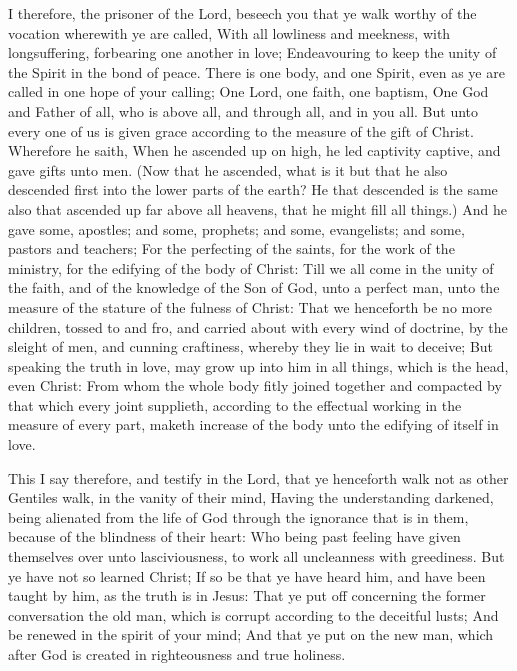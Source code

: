  I therefore, the prisoner of the Lord, beseech you that
ye walk worthy of the vocation wherewith ye are called, 
With all lowliness and meekness, with longsuffering, forbearing one
another in love;  Endeavouring to keep the unity of the
Spirit in the bond of peace.  There is one body, and one
Spirit, even as ye are called in one hope of your calling;
 One Lord, one faith, one baptism,  One God
and Father of all, who is above all, and through all, and in you all.
 But unto every one of us is given grace according to the
measure of the gift of Christ.  Wherefore he saith, When
he ascended up on high, he led captivity captive, and gave gifts unto
men.  (Now that he ascended, what is it but that he also
descended first into the lower parts of the earth?  He
that descended is the same also that ascended up far above all heavens,
that he might fill all things.)  And he gave some,
apostles; and some, prophets; and some, evangelists; and some, pastors
and teachers;  For the perfecting of the saints, for the
work of the ministry, for the edifying of the body of Christ:
 Till we all come in the unity of the faith, and of the
knowledge of the Son of God, unto a perfect man, unto the measure of the
stature of the fulness of Christ:  That we henceforth be
no more children, tossed to and fro, and carried about with every wind
of doctrine, by the sleight of men, and cunning craftiness, whereby they
lie in wait to deceive;  But speaking the truth in love,
may grow up into him in all things, which is the head, even Christ:
 From whom the whole body fitly joined together and
compacted by that which every joint supplieth, according to the
effectual working in the measure of every part, maketh increase of the
body unto the edifying of itself in love.

 This I say therefore, and testify in the Lord, that ye
henceforth walk not as other Gentiles walk, in the vanity of their mind,
 Having the understanding darkened, being alienated from
the life of God through the ignorance that is in them, because of the
blindness of their heart:  Who being past feeling have
given themselves over unto lasciviousness, to work all uncleanness with
greediness.  But ye have not so learned Christ;
 If so be that ye have heard him, and have been taught by
him, as the truth is in Jesus:  That ye put off
concerning the former conversation the old man, which is corrupt
according to the deceitful lusts;  And be renewed in the
spirit of your mind;  And that ye put on the new man,
which after God is created in righteousness and true holiness.

